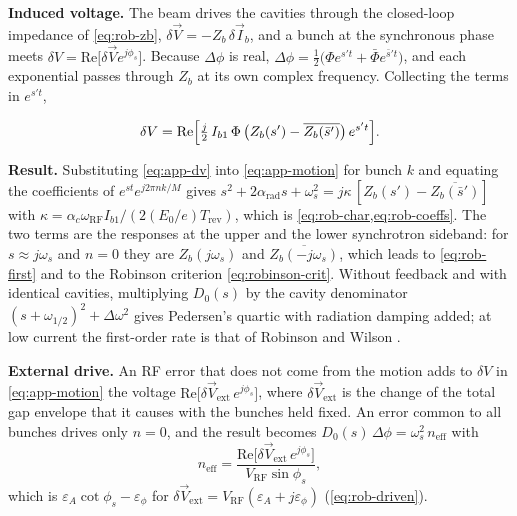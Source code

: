 \textbf{Induced voltage.} The beam drives the cavities through the closed-loop impedance of \cref{eq:rob-zb}, \(\delta\vec{V} = -Z_b\,\delta\vec{I}_b\), and a bunch at the synchronous phase meets \(\delta V = \text{Re}\bigl[\delta\vec{V}e^{j\phi_s}\bigr]\). Because \(\Delta\phi\) is real, \(\Delta\phi = \tfrac{1}{2}\bigl(\Phi e^{s't} + \bar\Phi e^{\bar s' t}\bigr)\), and each exponential passes through \(Z_b\) at its own complex frequency. Collecting the terms in \(e^{s't}\),

\begin{equation}\label{eq:app-dv}
\delta V = \text{Re}\Bigl[\tfrac{j}{2}\,I_{b1}\,\Phi\,\bigl(Z_b(s') - \overline{Z_b(\bar s')}\bigr)\,e^{s't}\Bigr].
\end{equation}

\textbf{Result.} Substituting \cref{eq:app-dv} into \cref{eq:app-motion} for bunch \(k\) and equating the coefficients of \(e^{st}e^{j2\pi nk/M}\) gives \(s^2 + 2\alpha_\text{rad}s + \omega_s^2 = j\kappa\,[Z_b(s') - \overline{Z_b(\bar s')}]\) with \(\kappa = \alpha_c\omega_\text{RF}I_{b1}/(2(E_0/e)T_\text{rev})\), which is \cref{eq:rob-char,eq:rob-coeffs}. The two terms are the responses at the upper and the lower synchrotron sideband: for \(s \approx j\omega_s\) and \(n = 0\) they are \(Z_b(j\omega_s)\) and \(\overline{Z_b(-j\omega_s)}\), which leads to \cref{eq:rob-first} and to the Robinson criterion \eqref{eq:robinson-crit}. Without feedback and with identical cavities, multiplying \(D_0(s)\) by the cavity denominator \((s + \omega_{1/2})^2 + \Delta\omega^2\) gives Pedersen's quartic  with radiation damping added; at low current the first-order rate is that of Robinson  and Wilson .

\textbf{External drive.} An RF error that does not come from the motion adds to \(\delta V\) in \cref{eq:app-motion} the voltage \(\text{Re}\bigl[\delta\vec{V}_\text{ext}\,e^{j\phi_s}\bigr]\), where \(\delta\vec{V}_\text{ext}\) is the change of the total gap envelope that it causes with the bunches held fixed. An error common to all bunches drives only \(n = 0\), and the result becomes \(D_0(s)\,\Delta\phi = \omega_s^2\,n_\text{eff}\) with
\begin{equation}\label{eq:app-drive}
n_\text{eff} = \frac{\text{Re}\bigl[\delta\vec{V}_\text{ext}\,e^{j\phi_s}\bigr]}{V_\text{RF}\sin\phi_s},
\end{equation}
which is \(\varepsilon_A\cot\phi_s - \varepsilon_\phi\) for \(\delta\vec{V}_\text{ext} = V_\text{RF}(\varepsilon_A + j\varepsilon_\phi)\) (\cref{eq:rob-driven}).

